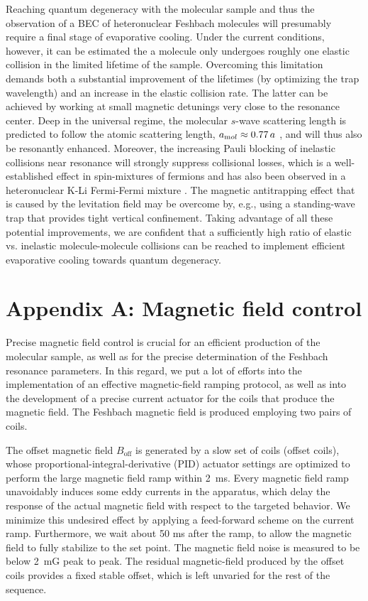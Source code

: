 Reaching quantum degeneracy with the molecular sample and thus the observation of a BEC of heteronuclear Feshbach molecules will presumably require a final stage of evaporative cooling. Under the current conditions, however, it can be estimated the a molecule only undergoes roughly one elastic collision in the limited lifetime of the sample. Overcoming this limitation demands both a substantial improvement of the lifetimes (by optimizing the trap wavelength) and an increase in the elastic collision rate. The latter can be achieved by working at small magnetic detunings very close to the resonance center. Deep in the universal regime, the molecular $s$-wave scattering length is predicted to follow the atomic scattering length, $a_{\textrm mol} \approx 0.77\,a$ \cite{Petrov2005dmi}, and will thus also be resonantly enhanced. Moreover, the increasing Pauli blocking of inelastic collisions near resonance \cite{Petrov2004wbd, Petrov2005dmi} will strongly suppress collisional losses, which is a well-established effect in spin-mixtures of fermions \cite{Varenna2006book} and has also been observed in a heteronuclear K-Li Fermi-Fermi mixture \cite{Jag2016lof}. The magnetic antitrapping effect that is caused by the levitation field may be overcome by, e.g., using a standing-wave trap that provides tight vertical confinement. Taking advantage of all these potential improvements, we are confident that a sufficiently high ratio of elastic vs. inelastic molecule-molecule collisions can be reached to implement efficient evaporative cooling towards quantum degeneracy.


\section{Appendix A: Magnetic field control}\label{App:MagneticFieldControl}

Precise magnetic field control is crucial for an efficient production of the molecular sample, as well as for the precise determination of the Feshbach resonance parameters. In this regard, we put a lot of efforts into the implementation of an effective magnetic-field ramping protocol, as well as into the development of a precise current actuator for the coils that produce the magnetic field. The Feshbach magnetic field is produced employing two pairs of coils. 

The offset magnetic field $B_{\textrm{off}}$ is generated by a slow set of coils ({offset coils}), whose proportional-integral-derivative (PID) actuator settings are optimized to perform the large magnetic field ramp within \SI{2}{\milli\second}. 
Every magnetic field ramp unavoidably induces some eddy currents in the apparatus, which delay the response of the actual magnetic field with respect to the targeted behavior. We minimize this undesired effect by applying a feed-forward scheme on the current ramp. Furthermore, we wait about 50 ms after the ramp, to allow the magnetic field to fully stabilize to the set point. The magnetic field noise is measured to be below \SI{2}{\milli G} peak to peak.
The residual magnetic-field produced by the offset coils provides a fixed stable offset, which is left unvaried for the rest of the sequence.

